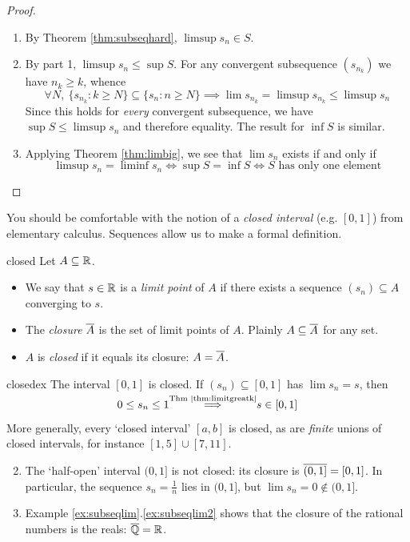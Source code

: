 \begin{proof}
\begin{enumerate}
  \item By Theorem \ref{thm:subseqhard}, $\limsup s_n\in S$.
  \item By part 1, $\limsup s_n\le \sup S$. For any convergent subsequence $(s_{n_k})$ we have $n_k\ge k$, whence
	\[
		\forall N,\ \{s_{n_k}:k\ge N\}\subseteq\{s_n:n\ge N\}\implies \lim s_{n_k}=\limsup s_{n_k}\le\limsup s_n
	\]
	Since this holds for \emph{every} convergent subsequence, we have $\sup S\le\limsup s_n$ and therefore equality. The result for $\inf S$ is similar.
  \item Applying Theorem \ref{thm:limbig}, we see that $\lim s_n$ exists if and only if
  \[
		\limsup s_n=\liminf s_n \iff \sup S=\inf S \iff S\text{ has only one element}\tag*{\qedhere}
	\]
\end{enumerate}
\end{proof}


You should be comfortable with the notion of a \emph{closed interval} (e.g.{} $[0,1]$) from elementary calculus. Sequences allow us to make a formal definition. 

\begin{defn}{}{closed}
	Let $A\subseteq\mathbb{R}$.
	\begin{itemize}
	  \item We say that $s\in\mathbb{R}$ is a \emph{limit point} of $A$ if there exists a sequence $(s_n)\subseteq A$ converging to $s$.
	  \item The \emph{closure} $\overline{A}$ is the set of limit points of $A$. Plainly $A\subseteq\overline{A}$ for any set.
	  \item $A$ is \emph{closed} if it equals its closure: $A=\overline{A}$.
	\end{itemize}
\end{defn}

\begin{examples}{}{closedex}
	\exstart The interval $[0,1]$ is closed. If $(s_n)\subseteq [0,1]$ has $\lim s_n=s$, then
  \[0\le s_n\le 1 \smash[t]{\overset{\text{Thm \ref{thm:limitgreatk}}}{\implies}} s\in [0,1]\]
  More generally, every `closed interval' $[a,b]$ is closed, as are \emph{finite} unions of closed intervals, for instance $[1,5]\cup[7,11]$.
	\begin{enumerate}\setcounter{enumi}{1}
  	\item\label{ex:closedex2} The `half-open' interval $(0,1]$ is not closed: its closure is $\overline{(0,1]}=[0,1]$. In particular, the sequence $s_n=\frac 1n$ lies in $(0,1]$, but $\lim s_n=0\not\in(0,1]$.
  	\item Example \ref*{ex:subseqlim}.\ref{ex:subseqlim2} shows that the closure of the rational numbers is the reals: $\overline{\mathbb{Q}}=\mathbb{R}$.
	\end{enumerate}
\end{examples}


